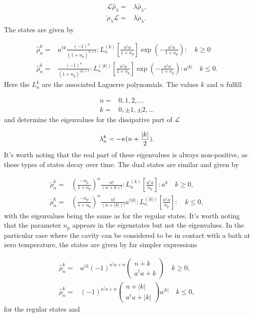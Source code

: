 \documentclass[12pt]{article}
\begin{document}
\begin{align}
    \mathcal{L}\hat{\rho}_\lambda =& \lambda \hat{\rho}_\lambda, \\
    \check{\rho}_\lambda\mathcal{L} =& \lambda \check{\rho}_\lambda.
\end{align} The states are given by

\begin{align}
  \hat{\rho}_n^k=& a^{\dagger k} \frac{(-1)^{n}}{(1+n_p)^{k+1}}: L_{n}^{(k)}\left[\frac{a^{\dagger} a}{1+n_p}\right] \exp (-\frac{a^{\dagger} a}{1+n_p}):  \quad k \geq 0 \nonumber\\
    \hat{\rho}_n^k=& \frac{(-1)^{n}}{(1+n_p)^{|k|+1}}: L_{n}^{(|k|)}\left[\frac{a^{\dagger} a}{1+n_p}\right] \exp (-\frac{a^{\dagger} a}{1+n_p}): a^{|k|}  \quad k \leq 0 . \nonumber
\end{align} Here the $L_n^k$ are the associated Laguerre polynomials. The values $k$ and $n$ fulfill

\begin{align}
    n=&0,1,2,\dots \\
    k=&0,\pm 1,\pm 2, \dots
\end{align} and determine the eigenvalues for the dissipative part of $\mathcal{L}$

\begin{equation}
    \lambda_n^k=-\kappa (n+\frac{\abs{k}}{2}).
\end{equation} It's worth noting that the real part of these eigenvalues is always non-positive, as these types of states decay over time. The dual states are similar and given by

\begin{align}
    \check{\rho}_n^k=&(\frac{-n_p}{1+n_p})^{n} \frac{n !}{(n+k) !}: L_{n}^{(k)}\left[\frac{a^{\dagger} a}{n_p}\right]: a^{k} \quad  k \geq 0, \nonumber \\
   \check{\rho}_n^k=&(\frac{-n_p}{1+n_p})^{n} \frac{n !}{(n+|k|) !} a^{\dagger|k|}: L_{n}^{(|k|)}\left[\frac{a^{\dagger} a}{n_p}\right]: \quad k \leq 0, \nonumber
\end{align} with the eigenvalues being the same as for the regular states. It's worth noting that the parameter $n_p$ appears in the eigenstates but not the eigenvalues. In the particular case where the cavity can be considered to be in contact with a bath at zero temperature, the states are given by far simpler expressions

\begin{align}
    \hat{\rho}_n^k=&\nonumber a^{\dagger k}(-1)^{a^{\dagger} a+n}(\begin{array}{c}
n+k \\
a^{\dagger} a+k
\end{array}) \quad k \geq 0, \\
\hat{\rho}_n^k=& \nonumber (-1)^{a^{\dagger} a+n}(\begin{array}{c}
n+|k| \\
a^{\dagger} a+|k|
\end{array}) a^{|k|} \quad k \leq 0,
\end{align} for the regular states and 
\end{document}
